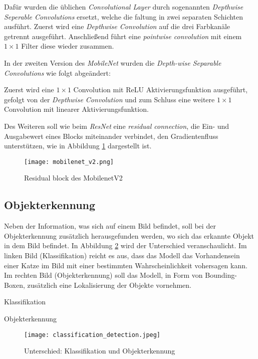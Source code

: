 Dafür wurden die üblichen \textit{Convolutional Layer}
durch sogenannten \textit{Depthwise Seperable 
Convolutions} ersetzt, welche die \Gls{faltung} in zwei separaten 
Schichten ausführt. Zuerst wird eine \textit{Depthwise  
Convolution} auf die drei Farbkanäle getrennt ausgeführt.
Anschließend führt eine \textit{pointwise convolution}
mit einem $1\times1$ Filter diese wieder zusammen.


In der zweiten Version des \textit{MobileNet}
\cite{sandlerMobileNetV2InvertedResiduals2019}
wurden die \textit{Depth-wise Separable Convolutions}
wie folgt abgeändert:

Zuerst wird eine $1\times1$ Convolution mit ReLU
Aktivierungsfunktion ausgeführt, gefolgt
von der \textit{Depthwise Convolution} und zum 
Schluss eine weitere $1\times1$ Convolution 
mit linearer Aktivierungsfunktion.


Des Weiteren soll wie beim \textit{ResNet} eine 
\textit{residual connection}, die Ein- und
Ausgabewert eines Blocks miteinander verbindet,
den Gradientenfluss unterstützen, wie in Abbildung 
\ref{fig:mobilenetv2} dargestellt ist.
\vspace{1cm}

\begin{figure}[H]
    \centering
    \texttt{[image: mobilenet\_v2.png]}
    \caption{Residual block des MobilenetV2
    \cite{sandlerMobileNetV2InvertedResiduals2019}}
    \label{fig:mobilenetv2}
\end{figure}


\subsection{Objekterkennung}\label{subsec:objdet_det}

Neben der Information, was sich auf einem Bild befindet, 
soll bei der Objekterkennung zusätzlich herausgefunden werden, 
wo sich das erkannte Objekt in dem Bild befindet.
In Abbildung \ref{fig:class_vs_det} wird der Unterschied 
veranschaulicht. Im linken Bild (Klassifikation) 
reicht es aus, dass das Modell das Vorhandensein einer Katze
im Bild mit einer bestimmten Wahrscheinlichkeit vohersagen kann.
Im rechten Bild (Objekterkennung) soll das Modell,
in Form von Bounding-Boxen, zusätzlich eine Lokalisierung
der Objekte vornehmen.

\vspace{1cm}
\begin{minipage}{0.5\textwidth}
    \centering
    Klassifikation
\end{minipage}
\begin{minipage}{0.5\textwidth}
    \centering
    Objekterkennung
\end{minipage}
\begin{figure}[H]
    \centering
    \texttt{[image: classification\_detection.jpeg]}
    \caption{Unterschied: Klassifikation und Objekterkennung 
    \cite{catDog}}
    \label{fig:class_vs_det}
\end{figure}
\vspace{1cm}


